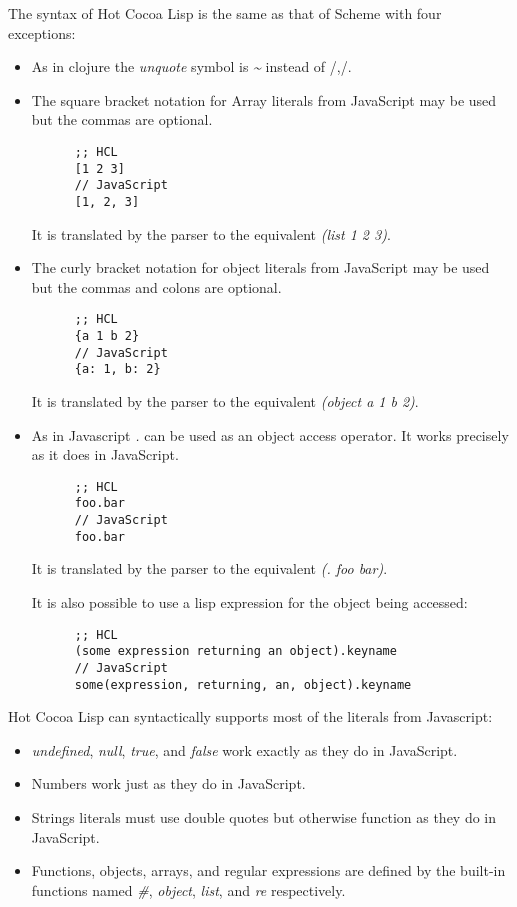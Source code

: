 \documentclass[11pt]{article}
\begin{document}
   The syntax of Hot Cocoa Lisp is the same as that of Scheme with
   four exceptions:
\begin{itemize}
\item As in clojure the \emph{unquote} symbol is \emph{\~{}} instead of /,/.
\item The square bracket notation for Array literals from JavaScript
     may be used but the commas are optional.
     
\begin{verbatim}
      ;; HCL
      [1 2 3]
      // JavaScript
      [1, 2, 3]
\end{verbatim}

     
     It is translated by the parser to the equivalent \emph{(list 1 2 3)}.
\item The curly bracket notation for object literals from JavaScript
     may be used but the commas and colons are optional.
     
\begin{verbatim}
      ;; HCL
      {a 1 b 2}
      // JavaScript
      {a: 1, b: 2}
\end{verbatim}

     
     It is translated by the parser to the equivalent \emph{(object a 1 b 2)}.
\item As in Javascript \emph{.} can be used as an object access operator.
     It works precisely as it does in JavaScript.
     
\begin{verbatim}
      ;; HCL
      foo.bar
      // JavaScript
      foo.bar
\end{verbatim}

     
     It is translated by the parser to the equivalent \emph{(. foo bar)}.
     
     It is also possible to use a lisp expression for the object being
     accessed:
     
\begin{verbatim}
      ;; HCL
      (some expression returning an object).keyname
      // JavaScript
      some(expression, returning, an, object).keyname
\end{verbatim}

\end{itemize}
   
   Hot Cocoa Lisp can syntactically supports most of the literals from
   Javascript:
\begin{itemize}
\item \emph{undefined}, \emph{null}, \emph{true}, and \emph{false} work exactly as they do
     in JavaScript.
\item Numbers work just as they do in JavaScript.
\item Strings literals must use double quotes but otherwise function as
     they do in JavaScript.
\item Functions, objects, arrays, and regular expressions are defined
     by the built-in functions named \emph{\#}, \emph{object}, \emph{list}, and \emph{re}
     respectively.
\end{itemize}
\end{document}
